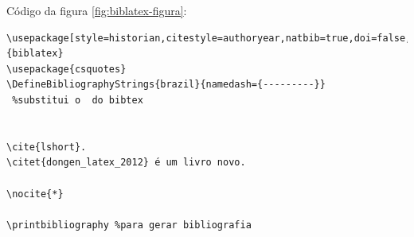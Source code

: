 Código da figura \ref{fig:biblatex-figura}:

\begin{verbatim}
\usepackage[style=historian,citestyle=authoryear,natbib=true,doi=false,backend=bibtex]{biblatex}
\usepackage{csquotes}
\DefineBibliographyStrings{brazil}{namedash={---------}}
 %substitui o  do bibtex


\cite{lshort}.
\citet{dongen_latex_2012} é um livro novo.

\nocite{*}

\printbibliography %para gerar bibliografia



\end{verbatim}

